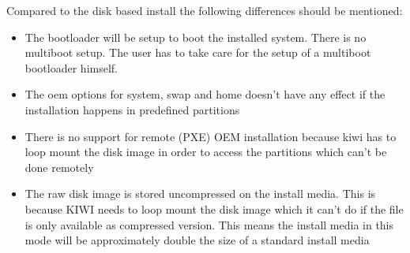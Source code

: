 Compared to the disk based install the following differences
should be mentioned:

\begin{itemize}
\item The bootloader will be setup to boot the installed system. There
      is no multiboot setup. The user has to take care for the setup
      of a multiboot bootloader himself.
\item The oem options for system, swap and home doesn't have any effect
      if the installation happens in predefined partitions
\item There is no support for remote (PXE) OEM installation because kiwi
      has to loop mount the disk image in order to access the partitions
      which can't be done remotely
\item The raw disk image is stored uncompressed on the install media.
      This is because KIWI needs to loop mount the disk image which it can't
      do if the file is only available as compressed version. This means
      the install media in this mode will be approximately double the size
      of a standard install media
\end{itemize}
